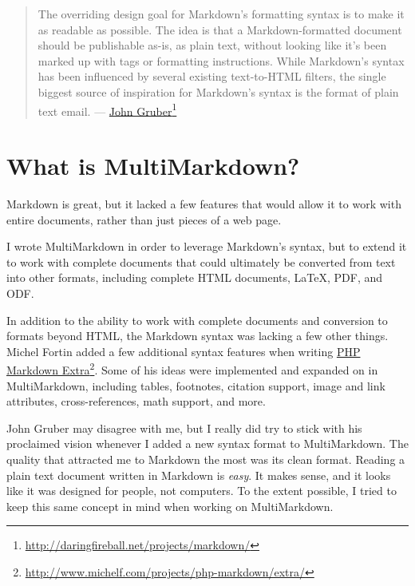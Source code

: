 \begin{quote}
The overriding design goal for Markdown's formatting syntax is to
make it as readable as possible. The idea is that a Markdown-formatted
document should be publishable as-is, as plain text, without looking
like it's been marked up with tags or formatting instructions. While
Markdown's syntax has been influenced by several existing
text-to-HTML filters, the single biggest source of inspiration for
Markdown's syntax is the format of plain text email. --- \href{http://daringfireball.net/projects/markdown/}{John Gruber}\footnote{\href{http://daringfireball.net/projects/markdown/}{http:\slash \slash daringfireball.net\slash projects\slash markdown\slash }}
\end{quote}

\section{What is MultiMarkdown? }
\label{whatismultimarkdown}

Markdown is great, but it lacked a few features that would allow it to work with entire documents, rather than just pieces of a web page.

I wrote MultiMarkdown in order to leverage Markdown's syntax, but to extend it to work with complete documents that could ultimately be converted from text into other formats, including complete HTML documents, LaTeX, PDF, and ODF.

In addition to the ability to work with complete documents and conversion to formats beyond HTML, the Markdown syntax was lacking a few other things. Michel Fortin added a few additional syntax features when writing \href{http://www.michelf.com/projects/php-markdown/extra/}{PHP Markdown Extra}\footnote{\href{http://www.michelf.com/projects/php-markdown/extra/}{http:\slash \slash www.michelf.com\slash projects\slash php-markdown\slash extra\slash }}. Some of his ideas were implemented and expanded on in MultiMarkdown, including tables, footnotes, citation support, image and link attributes, cross-references, math support, and more.

John Gruber may disagree with me, but I really did try to stick with his proclaimed vision whenever I added a new syntax format to MultiMarkdown. The quality that attracted me to Markdown the most was its clean format. Reading a plain text document written in Markdown is \emph{easy}. It makes sense, and it looks like it was designed for people, not computers. To the extent possible, I tried to keep this same concept in mind when working on MultiMarkdown.

